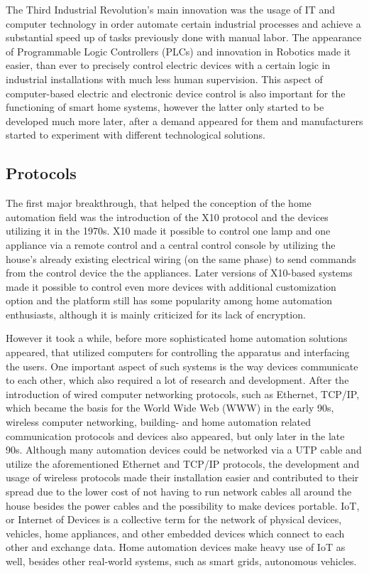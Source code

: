 The Third Industrial Revolution's main innovation was the usage of IT and computer technology in order automate certain industrial processes and achieve a substantial speed up of tasks previously done with manual labor. \cite{UpkeepIndRev}
The appearance of Programmable Logic Controllers (PLCs) and innovation in Robotics made it easier, than ever to precisely control electric devices with a certain logic in industrial installations with much less human supervision. This aspect of computer-based electric and electronic device control is also important for the functioning of smart home systems, however the latter only started to be developed much more later, after a demand appeared for them and manufacturers started to experiment with different technological solutions.

\subsection{Protocols}

The first major breakthrough, that helped the conception of the home automation field was the introduction of the X10 protocol and the devices utilizing it in the 1970s. X10 made it possible to control one lamp and one appliance via a remote control and a central control console by utilizing the house's already existing electrical wiring (on the same phase) to send commands from the control device the the appliances. Later versions of X10-based systems made it possible to control even more devices with additional customization option and the platform still has some popularity among home automation enthusiasts, although it is mainly criticized for its lack of encryption. \cite{CavaX10}

However it took a while, before more sophisticated home automation solutions appeared, that utilized computers for controlling the apparatus and interfacing the users. One important aspect of such systems is the way devices communicate to each other, which also required a lot of research and development.
After the introduction of wired computer networking protocols, such as Ethernet, TCP/IP, which became the basis for the World Wide Web (WWW) in the early 90s, wireless computer networking, building- and home automation related communication protocols and devices also appeared, but only later in the late 90s.
Although many automation devices could be networked via a UTP cable and utilize the aforementioned Ethernet and TCP/IP protocols, the development and usage of wireless protocols made their installation easier and contributed to their spread due to the lower cost of not having to run network cables all around the house besides the power cables and the possibility to make devices portable. IoT, or Internet of Devices is a collective term for the network of physical devices, vehicles, home appliances, and other embedded devices which connect to each other and exchange data. \cite{ShafiqIoTAttacks} Home automation devices make heavy use of IoT as well, besides other real-world systems, such as smart grids, autonomous vehicles.


